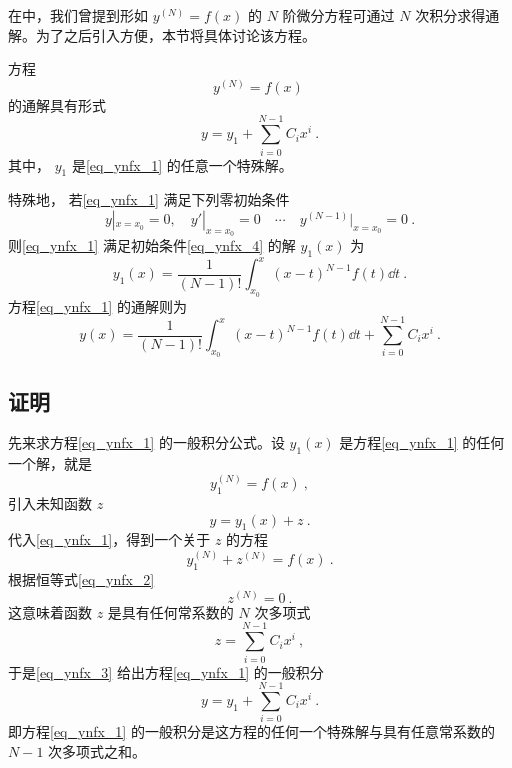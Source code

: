 
在中，我们曾提到形如 $y^{(N)}=f(x)$ 的 $N$ 阶微分方程可通过 $N$ 次积分求得通解。为了之后引入方便，本节将具体讨论该方程。

方程
\begin{equation}\label{eq_ynfx_1}
y^{(N)}=f(x)~
\end{equation}
的通解具有形式
\begin{equation}\label{eq_ynfx_7}
y=y_1+\sum_{i=0}^{N-1}C_ix^i~.
\end{equation}
其中， $y_1$ 是\autoref{eq_ynfx_1} 的任意一个特殊解。

特殊地， 若\autoref{eq_ynfx_1} 满足下列零初始条件
\begin{equation}\label{eq_ynfx_4}
y|_{x=x_0}=0,\quad y'|_{x=x_0}=0\quad\cdots \quad y^{(N-1)}|_{x=x_0}=0~.
\end{equation}
则\autoref{eq_ynfx_1} 满足初始条件\autoref{eq_ynfx_4} 的解 $y_1(x)$ 为
\begin{equation}\label{eq_ynfx_5}
y_1(x)=\frac{1}{(N-1)!}\int_{x_0}^x(x-t)^{N-1}f(t)\dd t~.
\end{equation}
方程\autoref{eq_ynfx_1} 的通解则为
\begin{equation}
y(x)=\frac{1}{(N-1)!}\int_{x_0}^x(x-t)^{N-1}f(t)\dd t+\sum_{i=0}^{N-1}C_ix^i~.
\end{equation}
\subsection{证明}
先来求方程\autoref{eq_ynfx_1} 的一般积分公式。设 $y_1(x)$ 是方程\autoref{eq_ynfx_1} 的任何一个解，就是
\begin{equation}\label{eq_ynfx_2}
y_1^{(N)}=f(x)~,
\end{equation}
引入未知函数 $z$
\begin{equation}\label{eq_ynfx_3}
y=y_1(x)+z~.
\end{equation}
代入\autoref{eq_ynfx_1}，得到一个关于 $z$ 的方程
\begin{equation}
y_1^{(N)}+z^{(N)}=f(x)~.
\end{equation}
根据恒等式\autoref{eq_ynfx_2} 
\begin{equation}
z^{(N)}=0~.
\end{equation}
这意味着函数 $z$ 是具有任何常系数的 $N$ 次多项式
\begin{equation}
z=\sum_{i=0}^{N-1}C_ix^i~,
\end{equation}
于是\autoref{eq_ynfx_3} 给出方程\autoref{eq_ynfx_1} 的一般积分
\begin{equation}
y=y_1+\sum_{i=0}^{N-1}C_ix^i~.
\end{equation}
即方程\autoref{eq_ynfx_1} 的一般积分是这方程的任何一个特殊解与具有任意常系数的 $N-1$ 次多项式之和。

